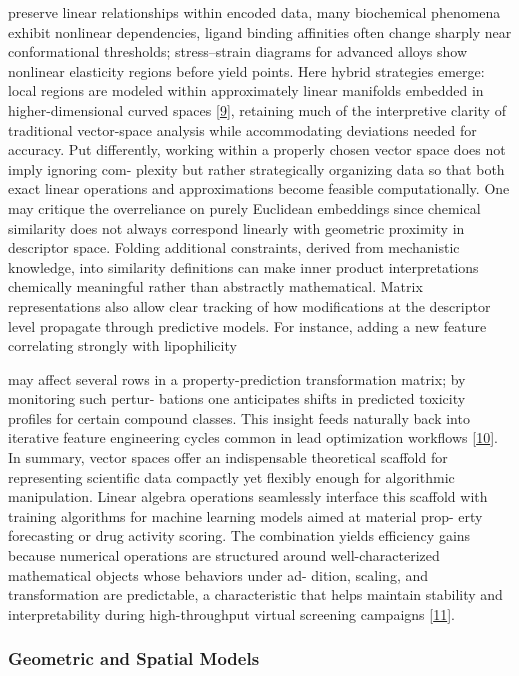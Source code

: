 \documentclass[
]{article}
\begin{document}
preserve linear relationships within encoded data, many biochemical
phenomena exhibit nonlinear dependencies, ligand binding affinities
often change sharply near conformational thresholds; stress--strain
diagrams for advanced alloys show nonlinear elasticity regions before
yield points. Here hybrid strategies emerge: local regions are modeled
within approximately linear manifolds embedded in higher-dimensional
curved spaces {[}\hyperref[_bookmark49]{9}{]}, retaining much of the
interpretive clarity of traditional vector-space analysis while
accommodating deviations needed for accuracy. Put differently, working
within a properly chosen vector space does not imply ignoring com-
plexity but rather strategically organizing data so that both exact
linear operations and approximations become feasible computationally.
One may critique the overreliance on purely Euclidean embeddings since
chemical similarity does not always correspond linearly with geometric
proximity in descriptor space. Folding additional constraints, derived
from mechanistic knowledge, into similarity definitions can make inner
product interpretations chemically meaningful rather than abstractly
mathematical. Matrix representations also allow clear tracking of how
modifications at the descriptor level propagate through predictive
models. For instance, adding a new feature correlating strongly with
lipophilicity

may affect several rows in a property-prediction transformation matrix;
by monitoring such pertur- bations one anticipates shifts in predicted
toxicity profiles for certain compound classes. This insight feeds
naturally back into iterative feature engineering cycles common in lead
optimization workflows {[}\hyperref[_bookmark50]{10}{]}. In summary,
vector spaces offer an indispensable theoretical scaffold for
representing scientific data compactly yet flexibly enough for
algorithmic manipulation. Linear algebra operations seamlessly interface
this scaffold with training algorithms for machine learning models aimed
at material prop- erty forecasting or drug activity scoring. The
combination yields efficiency gains because numerical operations are
structured around well-characterized mathematical objects whose
behaviors under ad- dition, scaling, and transformation are predictable,
a characteristic that helps maintain stability and interpretability
during high-throughput virtual screening campaigns
{[}\hyperref[_bookmark51]{11}{]}.

\subsubsection{Geometric and Spatial
Models}\label{geometric-and-spatial-models}
\end{document}
